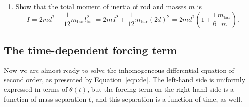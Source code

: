 \documentclass{article}
\begin{document}
\begin{enumerate}[resume]
\item  Show that the total moment of inertia of rod and masses $m$ is
  \begin{equation}
    I=2md^{2}+\frac{1}{12}m_{\mathrm{bar}}l_{\mathrm{bar}}^{2}=2md^{2}+\frac
    {1}{12}m_{\mathrm{bar}}\left(  2d\right)  ^{2}=2md^{2}\left(  1+\frac{1}%
      {6}\frac{m_{\mathrm{bar}}}{m}\right).
    \label{eqn:G6}%
  \end{equation}
\end{enumerate}

\subsection*{The time-dependent forcing term}
Now we are almost ready to solve the inhomogeneous differential
equation of second order, as presented by Equation~\ref{eqn:de}. The
left-hand side is uniformly expressed in terms of $\theta(t)$, but the
forcing term on the right-hand side is a function of mass separation
$b$, and this separation is a function of time, as well.
\end{document}
